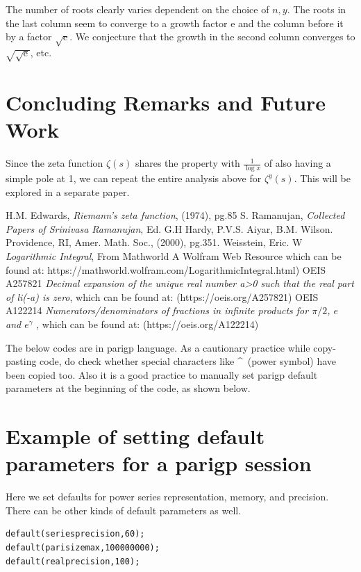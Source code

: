 \documentclass[a4paper,11pt,twoside]{amsart}
\newcommand\e{\mathrm{e}}
\begin{document}
The number of roots clearly varies dependent on the choice of $n, y$. The roots in the last column seem to converge to a growth factor $\e$ and the column before it by a factor $\sqrt{\e}$. We conjecture that the growth in the second column converges to $\sqrt{\sqrt{\e}}$, etc.


  
\section{Concluding Remarks and Future Work}

Since the zeta function $\zeta(s)$ shares the property with $\frac{1}{\log x}$ of also having a simple pole at 1, we can repeat the entire analysis above for $\zeta^{y}(s)$. This will be explored in a separate paper.

\begin{thebibliography}{99} 

H.M. Edwards, \emph{Riemann's zeta function}, (1974), pg.85
S. Ramanujan, \emph{Collected Papers of Srinivasa Ramanujan}, Ed. G.H Hardy, P.V.S. Aiyar, B.M. Wilson. Providence, RI, Amer. Math. Soc., (2000), pg.351.
Weisstein, Eric. W \emph{Logarithmic Integral}, From Mathworld A Wolfram Web Resource which can be found at: https://mathworld.wolfram.com/LogarithmicIntegral.html)
OEIS A257821 \emph{Decimal expansion of the unique real number a>0 such that the real part of li(-a) is zero}, which can be found at: (https://oeis.org/A257821)
OEIS A122214 \emph{Numerators/denominators of fractions in infinite products for $\pi/2$, $e$ and $e^\gamma$ }, which can be found at: (https://oeis.org/A122214)
\end{thebibliography} 

\pagebreak

\appendix
\appendixpage
The below codes are in parigp language. As a cautionary practice while copy-pasting code, do check whether special characters like \textasciicircum \, (power symbol) have been copied too. Also it is a good practice to manually set parigp default parameters at the beginning of the code, as shown below.

\section{Example of setting default parameters for a parigp session}
Here we set defaults for power series representation, memory, and precision. There can be other kinds of default parameters as well.
\begin{verbatim}
default(seriesprecision,60);
default(parisizemax,100000000);
default(realprecision,100);
\end{verbatim}
\end{document}
